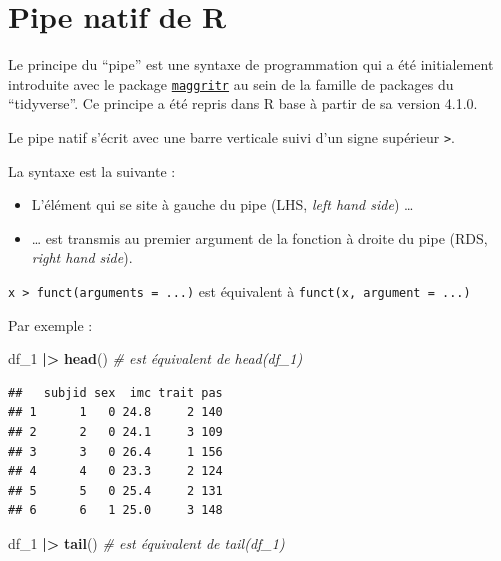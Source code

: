 \documentclass[
]{book}
\newenvironment{Shaded}{\begin{snugshade}}{\end{snugshade}}
\newcommand{\CommentTok}[1]{\textcolor[rgb]{0.56,0.35,0.01}{\textit{#1}}}
\newcommand{\FunctionTok}[1]{\textcolor[rgb]{0.13,0.29,0.53}{\textbf{#1}}}
\newcommand{\NormalTok}[1]{#1}
\newcommand{\SpecialCharTok}[1]{\textcolor[rgb]{0.81,0.36,0.00}{\textbf{#1}}}
\providecommand{\tightlist}{%
  \setlength{\itemsep}{0pt}\setlength{\parskip}{0pt}}
\begin{document}
\section{Pipe natif de R}\label{pipe-natif-de-r}

Le principe du ``pipe'' est une syntaxe de programmation qui a été initialement introduite avec le package \href{https://magrittr.tidyverse.org/}{\texttt{maggritr}} au sein de la famille de packages du ``tidyverse''. Ce principe a été repris dans R base à partir de sa version 4.1.0.

Le pipe natif s'écrit avec une barre verticale suivi d'un signe supérieur \texttt{\textbar{}\textgreater{}}.

La syntaxe est la suivante :

\begin{itemize}
\tightlist
\item
  L'élément qui se site à gauche du pipe (LHS, \emph{left hand side}) \ldots{}
\item
  \ldots{} est transmis au premier argument de la fonction à droite du pipe (RDS, \emph{right hand side}).
\end{itemize}

\texttt{x\ \textbar{}\textgreater{}\ funct(arguments\ =\ ...)} est équivalent à \texttt{funct(x,\ argument\ =\ ...)}

Par exemple :

\begin{Shaded}
\begin{Highlighting}[]
\NormalTok{df\_1 }\SpecialCharTok{|\textgreater{}} \FunctionTok{head}\NormalTok{() }\CommentTok{\# est équivalent de head(df\_1)}
\end{Highlighting}
\end{Shaded}

\begin{verbatim}
##   subjid sex  imc trait pas
## 1      1   0 24.8     2 140
## 2      2   0 24.1     3 109
## 3      3   0 26.4     1 156
## 4      4   0 23.3     2 124
## 5      5   0 25.4     2 131
## 6      6   1 25.0     3 148
\end{verbatim}

\begin{Shaded}
\begin{Highlighting}[]
\NormalTok{df\_1 }\SpecialCharTok{|\textgreater{}} \FunctionTok{tail}\NormalTok{()  }\CommentTok{\# est équivalent de tail(df\_1)}
\end{Highlighting}
\end{Shaded}
\end{document}
